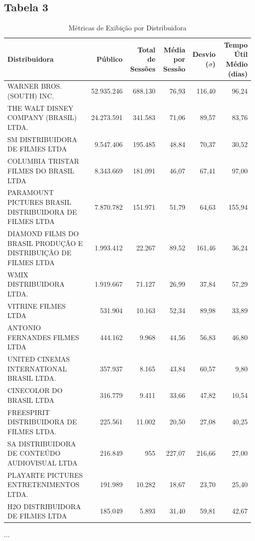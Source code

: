 \documentclass{article}
\begin{document}
\begin{landscape}
\subsection*{Tabela 3}
\begin{table}[H]
\centering
\small
\caption{Métricas de Exibição por Distribuidora}
\begin{tabular}{p{5cm}rrrrr}
\hline
\textbf{Distribuidora} & \textbf{Público} & \textbf{Total de Sessões} & \textbf{Média por Sessão} & \textbf{Desvio ($\sigma$)} & \textbf{Tempo Útil Médio (dias)} \\
\hline
WARNER BROS. (SOUTH) INC. & 52.935.246 & 688.130 & 76,93 & 116,40 & 96,24 \\
THE WALT DISNEY COMPANY (BRASIL) LTDA. & 24.273.591 & 341.583 & 71,06 & 89,57 & 83,76 \\
SM DISTRIBUIDORA DE FILMES LTDA & 9.547.406 & 195.485 & 48,84 & 70,37 & 30,52 \\
COLUMBIA TRISTAR FILMES DO BRASIL LTDA & 8.343.669 & 181.091 & 46,07 & 67,41 & 97,00 \\
PARAMOUNT PICTURES BRASIL DISTRIBUIDORA DE FILMES LTDA & 7.870.782 & 151.971 & 51,79 & 64,63 & 155,94 \\
DIAMOND FILMS DO BRASIL PRODUÇÃO E DISTRIBUIÇÃO DE FILMES LTDA & 1.993.412 & 22.267 & 89,52 & 161,46 & 36,24 \\
WMIX DISTRIBUIDORA LTDA. & 1.919.667 & 71.127 & 26,99 & 37,84 & 57,29 \\
VITRINE FILMES LTDA & 531.904 & 10.163 & 52,34 & 89,98 & 33,89 \\
ANTONIO FERNANDES FILMES LTDA & 444.162 & 9.968 & 44,56 & 56,83 & 46,80 \\
UNITED CINEMAS INTERNATIONAL BRASIL LTDA. & 357.937 & 8.165 & 43,84 & 60,57 & 9,80 \\
CINECOLOR DO BRASIL LTDA & 316.779 & 9.411 & 33,66 & 47,82 & 10,54 \\
FREESPIRIT DISTRIBUIDORA DE FILMES LTDA. & 225.561 & 11.002 & 20,50 & 27,08 & 40,25 \\
SA DISTRIBUIDORA DE CONTEÚDO AUDIOVISUAL LTDA & 216.849 & 955 & 227,07 & 216,66 & 27,00 \\
PLAYARTE PICTURES ENTRETENIMENTOS LTDA. & 191.989 & 10.282 & 18,67 & 23,70 & 25,40 \\
H2O DISTRIBUIDORA DE FILMES LTDA & 185.049 & 5.893 & 31,40 & 59,81 & 42,67 \\





\end{tabular}
\begin{center}
$\ldots$
\end{center}
\end{table}
\end{landscape}
\end{document}
